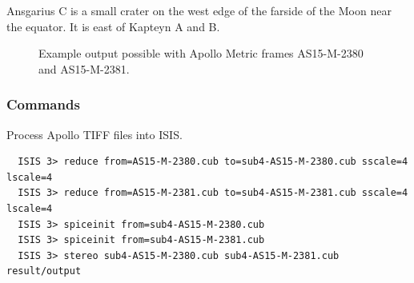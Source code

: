 Ansgarius C is a small crater on the west edge of the farside of the
Moon near the equator. It is east of Kapteyn A and B.

\begin{figure}[h!]
\centering
  \hfil
\caption{Example output possible with Apollo Metric frames AS15-M-2380 and AS15-M-2381.}
\label{fig:metric_example}
\end{figure}

\pagebreak

\subsubsection*{Commands}

Process Apollo TIFF files into \ac{ISIS}.
\begin{verbatim}
  ISIS 3> reduce from=AS15-M-2380.cub to=sub4-AS15-M-2380.cub sscale=4 lscale=4
  ISIS 3> reduce from=AS15-M-2381.cub to=sub4-AS15-M-2381.cub sscale=4 lscale=4
  ISIS 3> spiceinit from=sub4-AS15-M-2380.cub
  ISIS 3> spiceinit from=sub4-AS15-M-2381.cub
  ISIS 3> stereo sub4-AS15-M-2380.cub sub4-AS15-M-2381.cub result/output
\end{verbatim}

